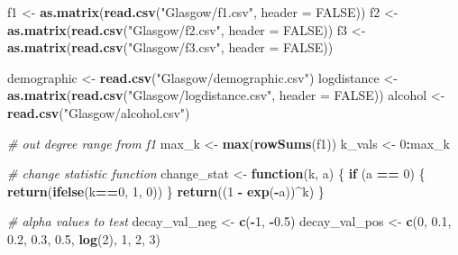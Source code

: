 \documentclass[
]{article}
\newenvironment{Shaded}{\begin{snugshade}}{\end{snugshade}}
\newcommand{\AttributeTok}[1]{\textcolor[rgb]{0.13,0.29,0.53}{#1}}
\newcommand{\CommentTok}[1]{\textcolor[rgb]{0.56,0.35,0.01}{\textit{#1}}}
\newcommand{\ConstantTok}[1]{\textcolor[rgb]{0.56,0.35,0.01}{#1}}
\newcommand{\ControlFlowTok}[1]{\textcolor[rgb]{0.13,0.29,0.53}{\textbf{#1}}}
\newcommand{\DecValTok}[1]{\textcolor[rgb]{0.00,0.00,0.81}{#1}}
\newcommand{\FloatTok}[1]{\textcolor[rgb]{0.00,0.00,0.81}{#1}}
\newcommand{\FunctionTok}[1]{\textcolor[rgb]{0.13,0.29,0.53}{\textbf{#1}}}
\newcommand{\NormalTok}[1]{#1}
\newcommand{\OtherTok}[1]{\textcolor[rgb]{0.56,0.35,0.01}{#1}}
\newcommand{\SpecialCharTok}[1]{\textcolor[rgb]{0.81,0.36,0.00}{\textbf{#1}}}
\newcommand{\StringTok}[1]{\textcolor[rgb]{0.31,0.60,0.02}{#1}}
\begin{document}
\begin{Shaded}
\begin{Highlighting}[]
\NormalTok{f1 }\OtherTok{\textless{}{-}} \FunctionTok{as.matrix}\NormalTok{(}\FunctionTok{read.csv}\NormalTok{(}\StringTok{"Glasgow/f1.csv"}\NormalTok{, }\AttributeTok{header =} \ConstantTok{FALSE}\NormalTok{))}
\NormalTok{f2 }\OtherTok{\textless{}{-}} \FunctionTok{as.matrix}\NormalTok{(}\FunctionTok{read.csv}\NormalTok{(}\StringTok{"Glasgow/f2.csv"}\NormalTok{, }\AttributeTok{header =} \ConstantTok{FALSE}\NormalTok{))}
\NormalTok{f3 }\OtherTok{\textless{}{-}} \FunctionTok{as.matrix}\NormalTok{(}\FunctionTok{read.csv}\NormalTok{(}\StringTok{"Glasgow/f3.csv"}\NormalTok{, }\AttributeTok{header =} \ConstantTok{FALSE}\NormalTok{))}

\NormalTok{demographic }\OtherTok{\textless{}{-}} \FunctionTok{read.csv}\NormalTok{(}\StringTok{"Glasgow/demographic.csv"}\NormalTok{)}
\NormalTok{logdistance }\OtherTok{\textless{}{-}} \FunctionTok{as.matrix}\NormalTok{(}\FunctionTok{read.csv}\NormalTok{(}\StringTok{"Glasgow/logdistance.csv"}\NormalTok{, }\AttributeTok{header =} \ConstantTok{FALSE}\NormalTok{))}
\NormalTok{alcohol }\OtherTok{\textless{}{-}} \FunctionTok{read.csv}\NormalTok{(}\StringTok{"Glasgow/alcohol.csv"}\NormalTok{)}

\CommentTok{\# out degree range from f1}
\NormalTok{max\_k }\OtherTok{\textless{}{-}} \FunctionTok{max}\NormalTok{(}\FunctionTok{rowSums}\NormalTok{(f1))}
\NormalTok{k\_vals }\OtherTok{\textless{}{-}} \DecValTok{0}\SpecialCharTok{:}\NormalTok{max\_k}

\CommentTok{\# change statistic function}
\NormalTok{change\_stat }\OtherTok{\textless{}{-}} \ControlFlowTok{function}\NormalTok{(k, a) \{}
  \ControlFlowTok{if}\NormalTok{ (a }\SpecialCharTok{==} \DecValTok{0}\NormalTok{) \{}
    \FunctionTok{return}\NormalTok{(}\FunctionTok{ifelse}\NormalTok{(k}\SpecialCharTok{==}\DecValTok{0}\NormalTok{, }\DecValTok{1}\NormalTok{, }\DecValTok{0}\NormalTok{))}
\NormalTok{  \}}
  \FunctionTok{return}\NormalTok{((}\DecValTok{1} \SpecialCharTok{{-}} \FunctionTok{exp}\NormalTok{(}\SpecialCharTok{{-}}\NormalTok{a))}\SpecialCharTok{\^{}}\NormalTok{k)}
\NormalTok{\}}

\CommentTok{\# alpha values to test}
\NormalTok{decay\_val\_neg }\OtherTok{\textless{}{-}} \FunctionTok{c}\NormalTok{(}\SpecialCharTok{{-}}\DecValTok{1}\NormalTok{, }\SpecialCharTok{{-}}\FloatTok{0.5}\NormalTok{)}
\NormalTok{decay\_val\_pos }\OtherTok{\textless{}{-}} \FunctionTok{c}\NormalTok{(}\DecValTok{0}\NormalTok{, }\FloatTok{0.1}\NormalTok{, }\FloatTok{0.2}\NormalTok{, }\FloatTok{0.3}\NormalTok{, }\FloatTok{0.5}\NormalTok{, }\FunctionTok{log}\NormalTok{(}\DecValTok{2}\NormalTok{), }\DecValTok{1}\NormalTok{, }\DecValTok{2}\NormalTok{, }\DecValTok{3}\NormalTok{)}


\end{Highlighting}
\end{Shaded}
\end{document}
